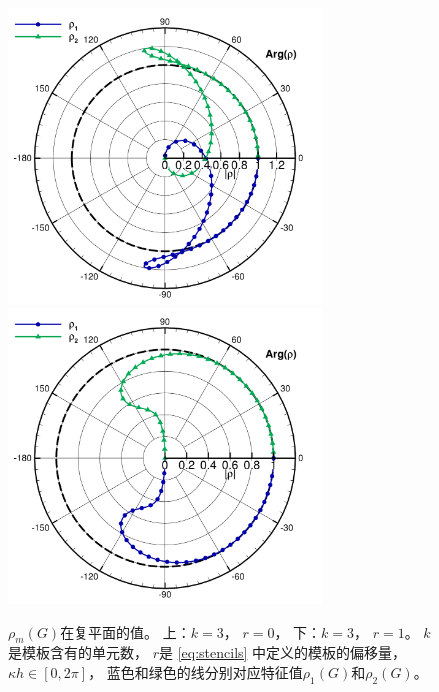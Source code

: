 \begin{figure}[htbp]
  \centering
  \includegraphics[width=0.74\textwidth]{fig/1D/pol60.pdf}
  \includegraphics[width=0.74\textwidth]{fig/1D/pol61.pdf}
  \caption{$\rho_m(G)$在复平面的值。
    上：$k=3$，
    $r=0$，
    下：$k=3$，
    $r=1$。
    $k$是模板含有的单元数，
    $r$是 \cref{eq:stencils} 中定义的模板的偏移量，
    $\kappa h\in [0,2\pi]$，
    蓝色和绿色的线分别对应特征值$\rho_1(G)$和$\rho_2(G)$。
  }
  \label{fig:eigens-2}
\end{figure}


